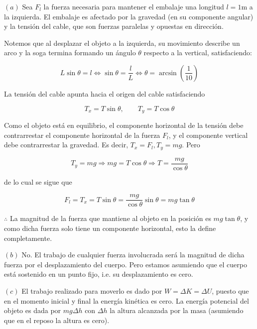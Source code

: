 \documentclass[12pt]{article}
\theoremstyle{definition}
\begin{document}
$(a)$ Sea $F_l$ la fuerza necesaria para mantener el embalaje una longitud $l =
1$m a la izquierda. El embalaje es afectado por la gravedad (en su componente
angular) y la tensión del cable, que son fuerzas paralelas y opuestas en
dirección.

Notemos que al desplazar el objeto a la izquierda, su movimiento describe un
arco y la soga termina formando un ángulo $\theta$ respecto a la vertical,
satisfaciendo:

\begin{equation*}
    L  \sin \theta = l \iff \sin \theta = \frac{l}{L} \iff \theta =
    \arcsin\left( \frac{1}{10} \right) 
\end{equation*}

La tensión del cable apunta hacia el origen del cable satisfaciendo 

\begin{equation*}
    T_x = T \sin \theta, \qquad T_y = T \cos \theta
\end{equation*}

Como el objeto está en equilibrio, el componente horizontal de la tensión debe
contrarrestar el componente horizontal de la fuerza $F_l$, y el componente
vertical debe contrarrestar la gravedad. Es decir, $T_x = F_l, T_y = mg$.  Pero 

\begin{equation*}
    T_y = mg \Rightarrow mg = T \cos \theta \Rightarrow T = \frac{mg}{\cos \theta}
\end{equation*}

de lo cual se sigue que 

\begin{equation*}
    F_l = T_x = T \sin \theta = \frac{mg}{\cos \theta} \sin \theta = mg \tan \theta
\end{equation*}

$\therefore $ La magnitud de la fuerza que mantiene al objeto en la posición es
$mg \tan \theta$, y como dicha fuerza solo tiene un componente horizontal, esto
la define completamente.


$(b)$ No. El trabajo de cualquier fuerza involucrada será la magnitud de dicha
fuerza por el desplazamiento del cuerpo. Pero estamos asumiendo que el cuerpo
está sostenido en un punto fijo, i.e. su desplazamiento es cero.

$(c)$ El trabajo realizado para moverlo es dado por $W = \Delta K = \Delta U$,
puesto que en el momento inicial y final la energía kinética es cero. La energía
potencial del objeto es dada por $mg \Delta h$ con $\Delta h$ la altura
alcanzada por la masa (asumiendo que en el reposo la altura es cero).
\end{document}
